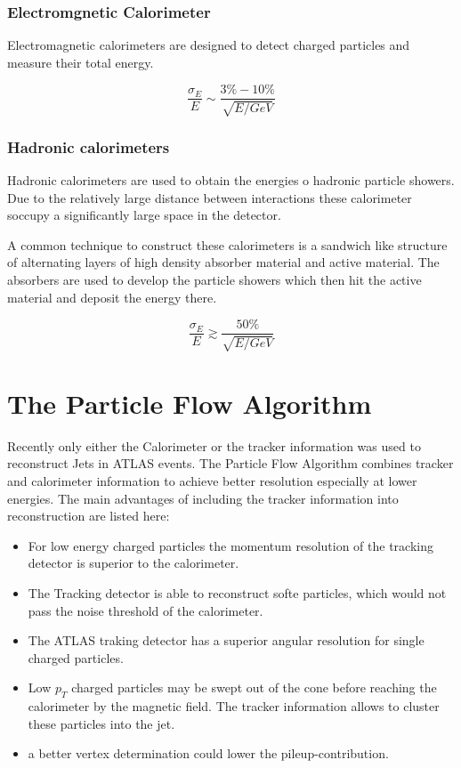 \subsubsection{Electromgnetic Calorimeter}

Electromagnetic calorimeters are designed to detect charged particles and measure their total energy.

\begin{equation}
\frac{\sigma_E}{E} \sim \frac{3 \% - 10 \%}{\sqrt{E/GeV}}
\end{equation}

\subsubsection{Hadronic calorimeters}

Hadronic calorimeters are used to obtain the energies o hadronic particle showers.
Due to the relatively large distance between interactions these calorimeter soccupy a significantly large space in the detector.

A common technique to construct these calorimeters is a sandwich like structure of alternating layers of high density absorber material and active material. 
The absorbers are used to develop the particle showers which then hit the active material and deposit the energy there.

\begin{equation}
\frac{\sigma_E}{E} \gtrsim \frac{50 \%}{\sqrt{E/GeV}}
\end{equation}






\section{The Particle Flow Algorithm}

Recently only either the Calorimeter or the tracker information was used to reconstruct Jets in ATLAS events. The Particle Flow Algorithm combines tracker and calorimeter information to achieve better resolution especially at lower energies. The main advantages of including the tracker information into reconstruction are listed here:


\begin{itemize}
\item For low energy charged particles the momentum resolution of the tracking detector is superior to the calorimeter.
\item The Tracking detector is able to reconstruct softe particles, which would not pass the noise threshold of the calorimeter.
\item The ATLAS traking detector has a superior angular resolution for single charged particles.
\item Low $p_T$ charged particles may be swept out of the cone before reaching the calorimeter by the magnetic field. The tracker information allows to cluster these particles into the jet.
\item a better vertex determination could lower the pileup-contribution.
\end{itemize}


